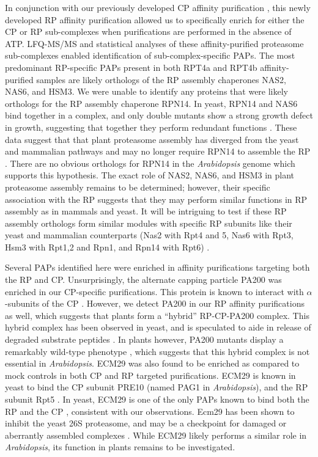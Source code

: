	In conjunction with our previously developed CP affinity purification \citep{book10}, this newly developed RP affinity purification allowed us to specifically enrich for either the CP or RP sub-complexes when purifications are performed in the absence of ATP. LFQ-MS/MS and statistical analyses of these affinity-purified proteasome sub-complexes enabled identification of sub-complex-specific PAPs. The most predominant RP-specific PAPs present in both RPT4a and RPT4b affinity-purified samples are likely orthologs of the RP assembly chaperones NAS2, NAS6, and HSM3. We were unable to identify any proteins that were likely orthologs for the RP assembly chaperone RPN14. In yeast, RPN14 and NAS6 bind together in a complex, and only double mutants show a strong growth defect in growth, suggesting that together they perform redundant functions \citep{funakoshi09}. These data suggest that that plant proteasome assembly has diverged from the yeast and mammalian pathways and may no longer require RPN14 to assemble the RP \citep{funakoshi09}. There are no obvious orthologs for RPN14 in the \textit{Arabidopsis} genome \citep{book10} which supports this hypothesis. The exact role of NAS2, NAS6, and HSM3 in plant proteasome assembly remains to be determined; however, their specific association with the RP suggests that they may perform similar functions in RP assembly as in mammals and yeast. It will be intriguing to test if these RP assembly orthologs form similar modules with specific RP subunits like their yeast and mammalian counterparts (Nas2 with Rpt4 and 5, Nas6 with Rpt3, Hsm3 with Rpt1,2 and Rpn1, and Rpn14 with Rpt6) \citep{park10}.
	   
Several PAPs identified here were enriched in affinity purifications targeting both the RP and CP. Unsurprisingly, the alternate capping particle PA200 was enriched in our CP-specific purifications. This protein is known to interact with $\alpha$-subunits of the CP \citep{ortega05}. However, we detect PA200 in our RP affinity purifications as well, which suggests that plants form a “hybrid” RP-CP-PA200 complex. This hybrid complex has been observed in yeast, and is speculated to aide in release of degraded substrate peptides \citep{ortega05, schmidt05, ustrell02}. In plants however, PA200 mutants display a remarkably wild-type phenotype \citep{book10}, which suggests that this hybrid complex is not essential in \textit{Arabidopsis}. ECM29 was also found to be enriched as compared to mock controls in both CP and RP targeted purifications. ECM29 is known in yeast to bind the CP subunit PRE10 (named PAG1 in \textit{Arabidopsis}), and the RP subunit Rpt5 \citep{wani16}. In yeast, ECM29 is one of the only PAPs known to bind both the RP and the CP \citep{lehmann10}, consistent with our observations. Ecm29 has been shown to inhibit the yeast 26S proteasome, and may be a checkpoint for damaged or aberrantly assembled complexes \citep{lehmann10}. While ECM29 likely performs a similar role in \textit{Arabidopsis}, its function in plants remains to be investigated.

